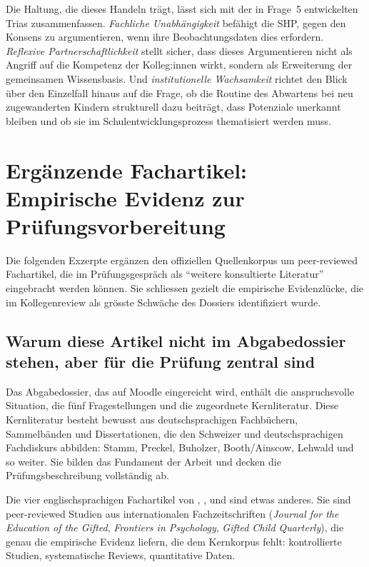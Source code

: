 \documentclass[ngerman, a4paper]{article}
\begin{document}
Die Haltung, die dieses Handeln trägt, lässt sich mit der in Frage~5
entwickelten Trias zusammenfassen. \textit{Fachliche Unabhängigkeit} befähigt
die SHP, gegen den Konsens zu argumentieren, wenn ihre Beobachtungsdaten dies
erfordern. \textit{Reflexive Partnerschaftlichkeit} stellt sicher, dass dieses
Argumentieren nicht als Angriff auf die Kompetenz der Kolleg:innen wirkt,
sondern als Erweiterung der gemeinsamen Wissensbasis. Und
\textit{institutionelle Wachsamkeit} richtet den Blick über den Einzelfall
hinaus auf die Frage, ob die Routine des Abwartens bei neu zugewanderten
Kindern strukturell dazu beiträgt, dass Potenziale unerkannt bleiben und
ob sie im Schulentwicklungsprozess thematisiert werden muss.


\newpage
\section*{Ergänzende Fachartikel: Empirische Evidenz zur Prüfungsvorbereitung}
\label{sec:fachartikel}

Die folgenden Exzerpte ergänzen den offiziellen Quellenkorpus um
peer-reviewed Fachartikel, die im Prüfungsgespräch als \enquote{weitere
konsultierte Literatur} eingebracht werden können. Sie schliessen gezielt
die empirische Evidenzlücke, die im Kollegenreview als grösste Schwäche
des Dossiers identifiziert wurde.

\subsection*{Warum diese Artikel nicht im Abgabedossier stehen, aber für die Prüfung zentral sind}

Das Abgabedossier, das auf Moodle eingereicht wird, enthält die anspruchsvolle Situation,
die fünf Fragestellungen und die zugeordnete Kernliteratur. Diese Kernliteratur besteht
bewusst aus deutschsprachigen Fachbüchern, Sammelbänden und Dissertationen, die den
Schweizer und deutschsprachigen Fachdiskurs abbilden: Stamm, Preckel, Buholzer,
Booth/Ainscow, Lehwald und so weiter. Sie bilden das Fundament der Arbeit und decken die
Prüfungsbeschreibung vollständig ab.

Die vier englischsprachigen Fachartikel von \textcite{mun2020identifying},
\textcite{gubbins2020promising}, \textcite{alhroub2021utility} und
\textcite{alodat2025equitable} sind etwas anderes. Sie sind peer-reviewed
Studien aus internationalen Fachzeitschriften
(\textit{Journal for the Education of the Gifted}, \textit{Frontiers in Psychology},
\textit{Gifted Child Quarterly}), die genau die empirische Evidenz liefern, die dem
Kernkorpus fehlt: kontrollierte Studien, systematische Reviews, quantitative Daten.
\end{document}

